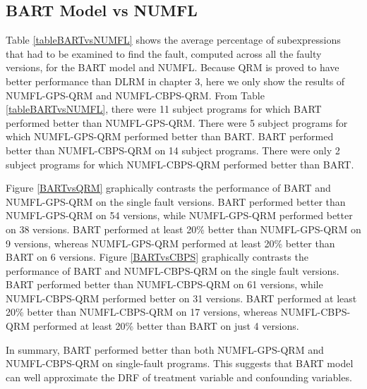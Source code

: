 \subsection{BART Model vs NUMFL}
Table \ref{tableBARTvsNUMFL} shows the average percentage of subexpressions that had to be examined to find the fault, computed across all the faulty versions, for the BART model and NUMFL.  Because QRM is proved to have better performance than DLRM in chapter 3, here we only show the results of NUMFL-GPS-QRM and NUMFL-CBPS-QRM.  From Table \ref{tableBARTvsNUMFL}, there were 11 subject programs for which BART performed better than NUMFL-GPS-QRM. There were 5 subject programs for which NUMFL-GPS-QRM performed better than BART. BART performed better than NUMFL-CBPS-QRM on 14 subject programs. There were only 2 subject programs for which NUMFL-CBPS-QRM performed better than BART.

Figure \ref{BARTvsQRM} graphically contrasts the performance of BART and NUMFL-GPS-QRM on the single fault versions.  BART performed better than NUMFL-GPS-QRM on 54 versions, while NUMFL-GPS-QRM performed better on 38 versions.  BART performed at least 20\% better than NUMFL-GPS-QRM on 9 versions, whereas NUMFL-GPS-QRM performed at least 20\% better than BART on 6 versions. Figure \ref{BARTvsCBPS} graphically contrasts the performance of BART and NUMFL-CBPS-QRM on the single fault versions.  BART performed better than NUMFL-CBPS-QRM on 61 versions, while NUMFL-CBPS-QRM performed better on 31 versions.  BART performed at least 20\% better than NUMFL-CBPS-QRM on 17 versions, whereas NUMFL-CBPS-QRM performed at least 20\% better than BART on just 4 versions.

In summary, BART  performed better than both NUMFL-GPS-QRM and NUMFL-CBPS-QRM on single-fault programs. This suggests that BART model can well approximate the DRF of treatment variable and confounding variables.

